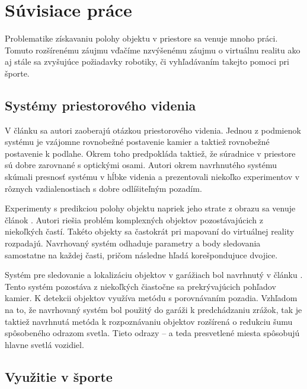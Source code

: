 
\chapter{Súvisiace práce}


Problematike získavaniu polohy objektu v priestore sa venuje mnoho práci.
Tomuto rozšírenému záujmu vďačíme nzvýšenému záujmu o virtuálnu realitu ako aj
stále sa zvyšujúce požiadavky robotiky, či vyhľadávaním takejto pomoci pri
športe.

\section{Systémy priestorového videnia}

V článku \citet*{zheng2010study} sa autori zaoberajú otázkou priestorového
videnia. Jednou z podmienok systému je vzájomne rovnobežné postavenie kamier a
taktiež rovnobežné postavenie k podlahe. Okrem toho predpokláda taktiež, že
súradnice v priestore sú dobre zarovnané s optickými osami. Autori okrem
navrhnutého systému skúmali presnosť systému v hĺbke videnia a prezentovali
niekoľko experimentov v rôznych vzdialenostiach s dobre odlíšiteľným pozadím.

Experimenty s predikciou polohy objektu napriek jeho strate z obrazu sa venuje
článok \citet*{black2002multi}. Autori \citet*{yonemoto1998tracking} riešia
problém komplexných objektov pozostávajúcich z niekoľkých častí. Takéto objekty
sa častokrát pri mapovaní do virtuálnej reality rozpadajú. Navrhovaný systém
odhaduje parametry a body sledovania samostatne na každej časti, pričom
následne hľadá korešpondujuce dvojice.

Systém pre sledovanie a lokalizáciu objektov v garážiach bol navrhnutý v článku
\citet*{ibisch2015arbitrary}. Tento systém pozostáva z niekoľkých čiastočne sa
prekrývajúcich pohľadov kamier. K detekcii objektov využíva metódu s
porovnávaním pozadia.  Vzhľadom na to, že navrhovaný systém bol použitý do
garáži k predchádzaniu zrážok, tak je taktiež navrhnutá metóda k rozpoznávaniu
objektov rozšírená o redukciu šumu spôsobeného odrazom svetla. Tieto odrazy --
a teda presvetlené miesta spôsobujú hlavne svetlá vozidiel.

\section{Využitie v športe}

